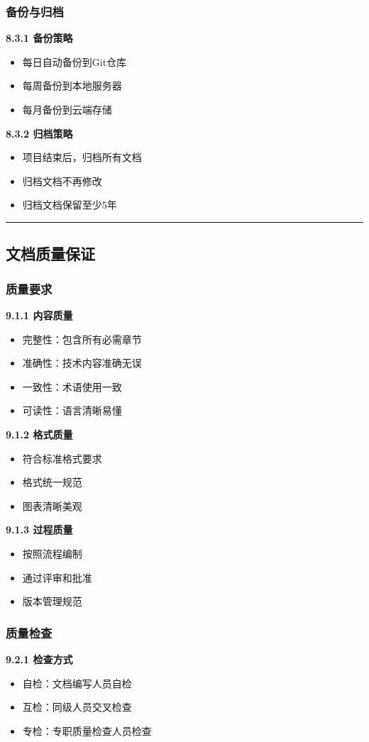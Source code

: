 \documentclass[12pt,a4paper]{article}
\numberwithin{equation}{section}  %
\begin{document}
\subsubsection{备份与归档}
\textbf{8.3.1 备份策略}
\begin{itemize}
\item 每日自动备份到Git仓库
\item 每周备份到本地服务器
\item 每月备份到云端存储
\end{itemize}

\textbf{8.3.2 归档策略}
\begin{itemize}
\item 项目结束后，归档所有文档
\item 归档文档不再修改
\item 归档文档保留至少5年
\end{itemize}

\hrule
\subsection{文档质量保证}
\subsubsection{质量要求}
\textbf{9.1.1 内容质量}
\begin{itemize}
\item 完整性：包含所有必需章节
\item 准确性：技术内容准确无误
\item 一致性：术语使用一致
\item 可读性：语言清晰易懂
\end{itemize}

\textbf{9.1.2 格式质量}
\begin{itemize}
\item 符合标准格式要求
\item 格式统一规范
\item 图表清晰美观
\end{itemize}

\textbf{9.1.3 过程质量}
\begin{itemize}
\item 按照流程编制
\item 通过评审和批准
\item 版本管理规范
\end{itemize}

\subsubsection{质量检查}
\textbf{9.2.1 检查方式}
\begin{itemize}
\item 自检：文档编写人员自检
\item 互检：同级人员交叉检查
\item 专检：专职质量检查人员检查
\end{itemize}
\end{document}
